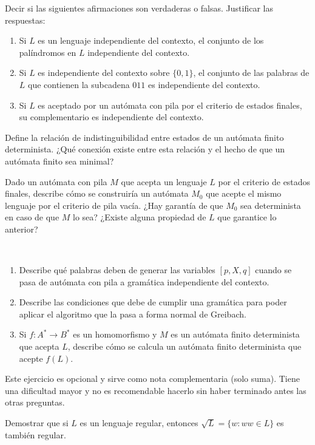 \documentclass[12pt]{article}
\begin{document}
    \begin{ejercicio}[1.25 puntos]
        Decir si las siguientes afirmaciones son verdaderas o falsas. Justificar las respuestas:
        \begin{enumerate}
            \item Si $L$ es un lenguaje independiente del contexto, el conjunto de los palíndromos en $L$ independiente del contexto.
            \item Si $L$ es independiente del contexto sobre $\{0, 1\}$, el conjunto de las palabras de $L$ que contienen la subcadena $011$ es independiente del contexto.
            \item Si $L$ es aceptado por un autómata con pila por el criterio de estados finales, su complementario es independiente del contexto.
        \end{enumerate}
    \end{ejercicio}

    \begin{ejercicio}[1.25 puntos]
        Define la relación de indistinguibilidad entre estados de un autómata finito determinista. ¿Qué conexión existe entre esta relación y el hecho de que un autómata finito sea minimal?
    \end{ejercicio}

    \begin{ejercicio}[1.25 puntos]
        Dado un autómata con pila $M$ que acepta un lenguaje $L$ por el criterio de estados finales, describe cómo se construiría un autómata $M_0$ que acepte el mismo lenguaje por el criterio de pila vacía. ¿Hay garantía de que $M_0$ sea determinista en caso de que $M$ lo sea? ¿Existe alguna propiedad de $L$ que garantice lo anterior?
    \end{ejercicio}

    \begin{ejercicio}[1.25 puntos]~
        \begin{enumerate}
            \item Describe qué palabras deben de generar las variables $[p, X, q]$ cuando se pasa de autómata con pila a gramática independiente del contexto.
            \item Describe las condiciones que debe de cumplir una gramática para poder aplicar el algoritmo que la pasa a forma normal de Greibach.
            \item Si $f : A^* \to B^*$ es un homomorfismo y $M$ es un autómata finito determinista que acepta $L$, describe cómo se calcula un autómata finito determinista que acepte $f(L)$.
        \end{enumerate}
    \end{ejercicio}

    \begin{ejercicio}[1 punto]
        \begin{observacion}
            Este ejercicio es opcional y sirve como nota complementaria (solo suma). Tiene una dificultad mayor y no es recomendable hacerlo sin haber terminado antes las otras preguntas.
        \end{observacion}
        Demostrar que si $L$ es un lenguaje regular, entonces $\sqrt{L} = \{w : ww \in L\}$ es también regular.
    \end{ejercicio}
\end{document}
